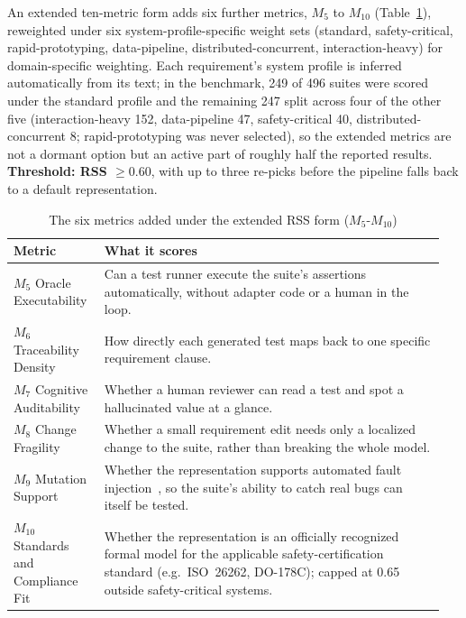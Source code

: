 \documentclass[conference]{IEEEtran}
\begin{document}
An extended ten-metric form adds six further metrics,
$M_5$ to $M_{10}$ (Table~\ref{tab:extmetrics}), reweighted under six
system-profile-specific weight sets (standard, safety-critical,
rapid-prototyping, data-pipeline, distributed-concurrent,
interaction-heavy) for domain-specific weighting. Each requirement's
system profile is inferred automatically from its text; in the benchmark,
249 of 496 suites were scored under the standard profile and the
remaining 247 split across four of the other five (interaction-heavy 152,
data-pipeline 47, safety-critical 40, distributed-concurrent 8;
rapid-prototyping was never selected), so the extended metrics are
not a dormant option but an active part of roughly half the reported
results. \textbf{Threshold: RSS $\geq 0.60$}, with up to three re-picks
before the pipeline falls back to a default representation.




\begin{table}[t]
\centering
\caption{The six metrics added under the extended RSS form ($M_5$-$M_{10}$)}
\label{tab:extmetrics}
\small
\begin{tabular}{@{}p{0.20\linewidth}p{0.75\linewidth}@{}}
\toprule
\textbf{Metric} & \textbf{What it scores} \\
\midrule
$M_5$ Oracle Executability & Can a test runner execute the suite's assertions automatically, without adapter code or a human in the loop. \\
$M_6$ Traceability Density & How directly each generated test maps back to one specific requirement clause. \\
$M_7$ Cognitive Auditability & Whether a human reviewer can read a test and spot a hallucinated value at a glance. \\
$M_8$ Change Fragility & Whether a small requirement edit needs only a localized change to the suite, rather than breaking the whole model. \\
$M_9$ Mutation Support & Whether the representation supports automated fault injection~\cite{jia2011mutation,just2014mutants}, so the suite's ability to catch real bugs can itself be tested. \\
$M_{10}$ Standards and Compliance Fit & Whether the representation is an officially recognized formal model for the applicable safety-certification standard (e.g.\ ISO~26262, DO-178C); capped at 0.65 outside safety-critical systems. \\
\bottomrule
\end{tabular}
\end{table}
\end{document}
